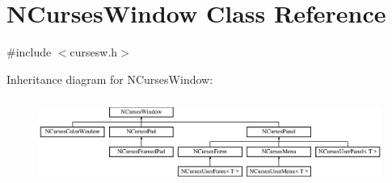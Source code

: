 \hypertarget{class_n_curses_window}{\section{N\-Curses\-Window Class Reference}
\label{class_n_curses_window}
}


{\ttfamily \#include $<$cursesw.\-h$>$}

Inheritance diagram for N\-Curses\-Window\-:\begin{figure}[H]
\begin{center}
\leavevmode
\includegraphics[height=2.835443cm]{class_n_curses_window}
\end{center}
\end{figure}
